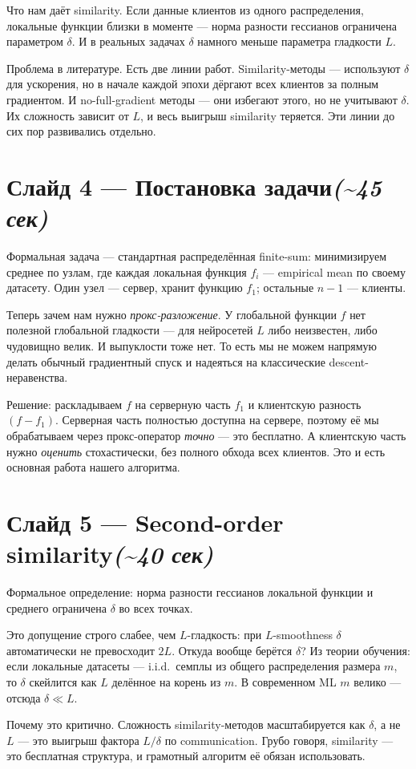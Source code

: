 \documentclass[11pt,a4paper]{article}
\newcommand{\slide}[3]{%
  \section*{Слайд #1 — #2\hfill\normalsize\color{lighttext}\textit{(\textasciitilde #3)}}%
}
\begin{document}
Что нам даёт similarity. Если данные клиентов из одного распределения, локальные функции близки в моменте — норма разности гессианов ограничена параметром $\delta$. И в реальных задачах $\delta$ намного меньше параметра гладкости $L$.

Проблема в литературе. Есть две линии работ. Similarity-методы — используют $\delta$ для ускорения, но в начале каждой эпохи дёргают всех клиентов за полным градиентом. И no-full-gradient методы — они избегают этого, но не учитывают $\delta$. Их сложность зависит от $L$, и весь выигрыш similarity теряется. Эти линии до сих пор развивались отдельно.

\slide{4}{Постановка задачи}{45 сек}

Формальная задача — стандартная распределённая finite-sum: минимизируем среднее по узлам, где каждая локальная функция $f_i$ — empirical mean по своему датасету. Один узел — сервер, хранит функцию $f_1$; остальные $n-1$ — клиенты.

Теперь зачем нам нужно \emph{прокс-разложение}. У глобальной функции $f$ нет полезной глобальной гладкости — для нейросетей $L$ либо неизвестен, либо чудовищно велик. И выпуклости тоже нет. То есть мы не можем напрямую делать обычный градиентный спуск и надеяться на классические descent-неравенства.

Решение: раскладываем $f$ на серверную часть $f_1$ и клиентскую разность $(f - f_1)$. Серверная часть полностью доступна на сервере, поэтому её мы обрабатываем через прокс-оператор \emph{точно} — это бесплатно. А клиентскую часть нужно \emph{оценить} стохастически, без полного обхода всех клиентов. Это и есть основная работа нашего алгоритма.

\slide{5}{Second-order similarity}{40 сек}

Формальное определение: норма разности гессианов локальной функции и среднего ограничена $\delta$ во всех точках.

Это допущение строго слабее, чем $L$-гладкость: при $L$-smoothness $\delta$ автоматически не превосходит $2L$. Откуда вообще берётся $\delta$? Из теории обучения: если локальные датасеты — i.i.d.~семплы из общего распределения размера $m$, то $\delta$ скейлится как $L$ делённое на корень из $m$. В современном ML $m$ велико — отсюда $\delta \ll L$.

Почему это критично. Сложность similarity-методов масштабируется как $\delta$, а не $L$ — это выигрыш фактора $L/\delta$ по communication. Грубо говоря, similarity — это бесплатная структура, и грамотный алгоритм её обязан использовать.
\end{document}
